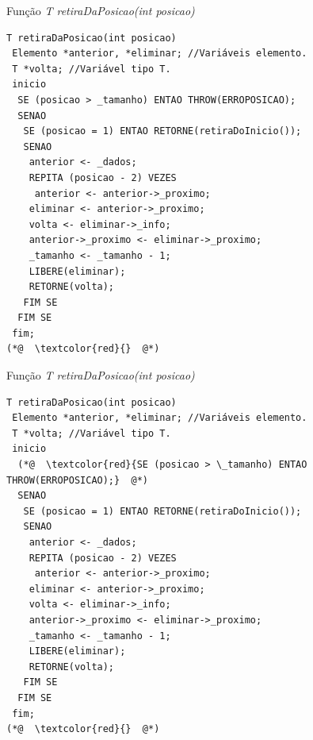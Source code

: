 \documentclass[12pt,table,xcolor={dvipsnames}]{beamer}
\begin{document}
\begin{frame}[fragile]{Função \textit{T retiraDaPosicao(int posicao)}}
\begin{lstlisting}
T retiraDaPosicao(int posicao)
 Elemento *anterior, *eliminar; //Variáveis elemento.
 T *volta; //Variável tipo T.
 inicio
  SE (posicao > _tamanho) ENTAO THROW(ERROPOSICAO);
  SENAO
   SE (posicao = 1) ENTAO RETORNE(retiraDoInicio());
   SENAO
    anterior <- _dados;
    REPITA (posicao - 2) VEZES
     anterior <- anterior->_proximo;
    eliminar <- anterior->_proximo;
    volta <- eliminar->_info;
    anterior->_proximo <- eliminar->_proximo;
    _tamanho <- _tamanho - 1;
    LIBERE(eliminar);
    RETORNE(volta);
   FIM SE
  FIM SE
 fim;
(*@  \textcolor{red}{}  @*)
\end{lstlisting}
\end{frame}

\begin{frame}[fragile]{Função \textit{T retiraDaPosicao(int posicao)}}
\begin{lstlisting}
T retiraDaPosicao(int posicao)
 Elemento *anterior, *eliminar; //Variáveis elemento.
 T *volta; //Variável tipo T.
 inicio
  (*@  \textcolor{red}{SE (posicao > \_tamanho) ENTAO THROW(ERROPOSICAO);}  @*)
  SENAO
   SE (posicao = 1) ENTAO RETORNE(retiraDoInicio());
   SENAO
    anterior <- _dados;
    REPITA (posicao - 2) VEZES
     anterior <- anterior->_proximo;
    eliminar <- anterior->_proximo;
    volta <- eliminar->_info;
    anterior->_proximo <- eliminar->_proximo;
    _tamanho <- _tamanho - 1;
    LIBERE(eliminar);
    RETORNE(volta);
   FIM SE
  FIM SE
 fim;
(*@  \textcolor{red}{}  @*)
\end{lstlisting}
\end{frame}
\end{document}
